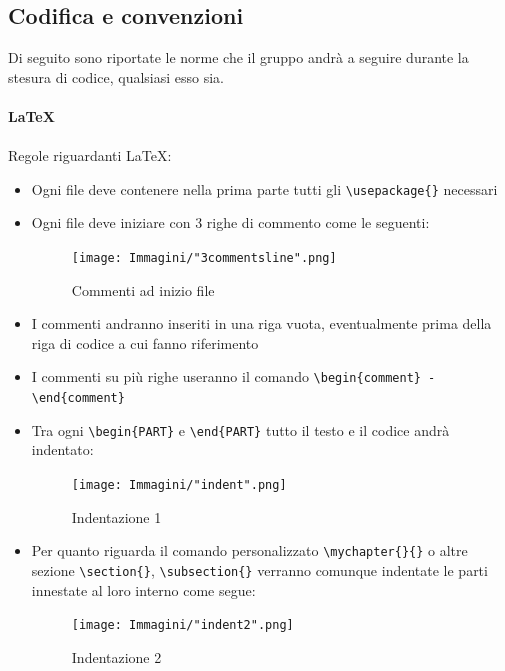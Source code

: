 \documentclass[a4paper]{report}
\newcommand{\mychapter}[2]{
	\setcounter{chapter}{#1}
	\setcounter{section}{0}
	\setcounter{subsection}{1}
	\chapter*{#2}
	\addcontentsline{toc}{chapter}{#2}
}
\begin{document}
	\subsection{Codifica e convenzioni}
	Di seguito sono riportate le norme che il gruppo andrà a seguire durante la stesura di codice, qualsiasi esso sia.
	\\ \\
	\textbf{\LaTeX} \\ \\ 
	Regole riguardanti \LaTeX :
	\begin{itemize}
		\item Ogni file deve contenere nella prima parte tutti gli \verb|\usepackage{}| necessari
		\item Ogni file deve iniziare con 3 righe di commento come le seguenti:
		\begin{figure}[h!]
			\centering
			\texttt{[image: Immagini/"3commentsline".png]}
			\caption{Commenti ad inizio file}
		\end{figure}
		\item I commenti andranno inseriti in una riga vuota, eventualmente prima della riga di codice a cui fanno riferimento
		\item I commenti su più righe useranno il comando \verb|\begin{comment} - \end{comment}|
		\item Tra ogni \verb|\begin{PART}| e \verb|\end{PART}| tutto il testo e il codice andrà indentato:
		\begin{figure}[h!]
			\centering
			\texttt{[image: Immagini/"indent".png]}
			\caption{Indentazione 1}
		\end{figure}
		\item Per quanto riguarda il comando personalizzato \verb|\mychapter{}{}| o altre sezione \verb|\section{}|, \verb|\subsection{}| 
		verranno comunque indentate le parti innestate al loro interno come segue:
		\begin{figure}[h!]
			\centering
			\texttt{[image: Immagini/"indent2".png]}
			\caption{Indentazione 2}

\end{figure}
\end{itemize}
\end{document}
